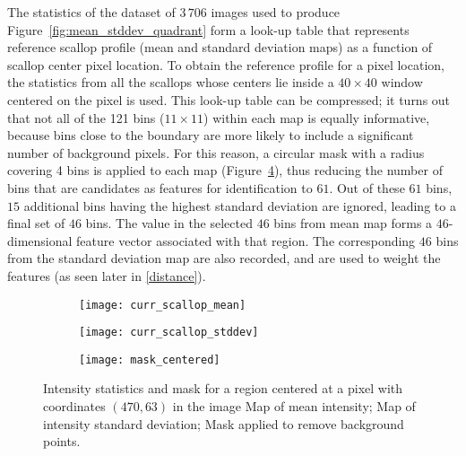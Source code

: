 The statistics of the dataset of $3\,706$ images used to produce Figure~\ref{fig:mean_stddev_quadrant} form a look-up table that represents reference scallop profile (mean and standard deviation maps) 
as a function of scallop center pixel location.
To obtain the reference profile for a pixel location, 
the statistics from all the scallops whose centers lie inside a $40\times40$ window centered on the pixel is used.
This look-up table can be compressed; it turns out that not all of the 121 bins ($11\times11$) within each map is equally informative, because bins close to the boundary are more likely to include a significant number of background pixels.
For this reason, a circular mask with a radius covering 4 bins is applied to each map (Figure~\ref{fig:scallop_learning_mask}), thus reducing the number of bins that are candidates as features for identification to $61$.
Out of these $61$ bins, $15$ additional bins having the highest standard deviation are ignored, leading to a final set of $46$ bins.
The value in the selected $46$ bins from mean map forms a $46$-dimensional feature vector associated with that region. The corresponding $46$ bins from the standard deviation map are also recorded, and are used to weight the features
(as seen later in \eqref{distance}).

\begin{figure}
  \centering
  \begin{subfigure}[]{0.3\textwidth}
      \texttt{[image: curr\_scallop\_mean]}
      \caption{}
      \label{subfig:mean_scallop}
  \end{subfigure}
  \begin{subfigure}[]{0.3\textwidth}
      \texttt{[image: curr\_scallop\_stddev]}
      \caption{}
      \label{subfig:stddev_scallop}
  \end{subfigure}
  \begin{subfigure}[]{0.3\textwidth}
      \texttt{[image: mask\_centered]}
      \caption{}
      \label{subfig:mask_scallop}
  \end{subfigure}
  \caption[Illustration of scallop profile hypothesis]{Intensity statistics and mask for a region centered at a pixel with coordinates $(470,63)$ in the image  Map of mean intensity;  Map of intensity standard deviation;
   Mask applied to remove background points.}
  \label{fig:scallop_learning_mask}
\end{figure}


